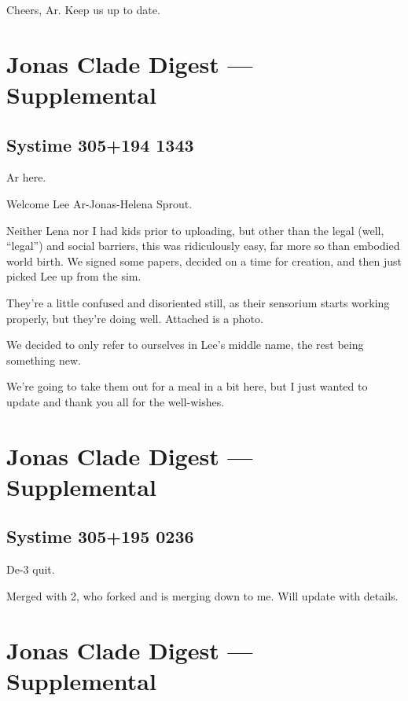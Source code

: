 Cheers, Ar. Keep us up to date.

\newpage
\hypertarget{jonas-clade-digest-supplemental-1}{%
\section*{Jonas Clade Digest --- Supplemental}\label{jonas-clade-digest-supplemental-1}}

\hypertarget{systime-305194-1343}{%
\subsection*{Systime 305+194 1343}\label{systime-305194-1343}}

Ar here.

Welcome Lee Ar-Jonas-Helena Sprout.

Neither Lena nor I had kids prior to uploading, but other than the legal (well, ``legal'') and social barriers, this was ridiculously easy, far more so than embodied world birth. We signed some papers, decided on a time for creation, and then just picked Lee up from the sim.

They're a little confused and disoriented still, as their sensorium starts working properly, but they're doing well. Attached is a photo.

We decided to only refer to ourselves in Lee's middle name, the rest being something new.

We're going to take them out for a meal in a bit here, but I just wanted to update and thank you all for the well-wishes.

\newpage
\hypertarget{jonas-clade-digest-supplemental-2}{%
\section*{Jonas Clade Digest --- Supplemental}\label{jonas-clade-digest-supplemental-2}}

\hypertarget{systime-305195-0236}{%
\subsection*{Systime 305+195 0236}\label{systime-305195-0236}}

De-3 quit.

Merged with 2, who forked and is merging down to me. Will update with details.

\newpage
\hypertarget{jonas-clade-digest-supplemental-3}{%
\section*{Jonas Clade Digest --- Supplemental}\label{jonas-clade-digest-supplemental-3}}


